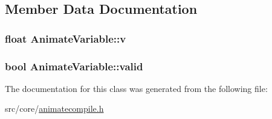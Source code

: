 \subsection{Member Data Documentation}
\hypertarget{a00009_aba880bb47e0afe67a8109f74aac1e2e1}{
\subsubsection[{v}]{\setlength{\rightskip}{0pt plus 5cm}float Animate\-Variable\-::v\hspace{0.3cm}{\ttfamily [private]}}}\label{a00009_aba880bb47e0afe67a8109f74aac1e2e1}
\hypertarget{a00009_a2917e81631573c67d7413697938254c6}{
\subsubsection[{valid}]{\setlength{\rightskip}{0pt plus 5cm}bool Animate\-Variable\-::valid\hspace{0.3cm}{\ttfamily [private]}}}\label{a00009_a2917e81631573c67d7413697938254c6}


The documentation for this class was generated from the following file\-:\begin{DoxyCompactItemize}
\item 
src/core/\hyperlink{a00200}{animatecompile.\-h}\end{DoxyCompactItemize}
